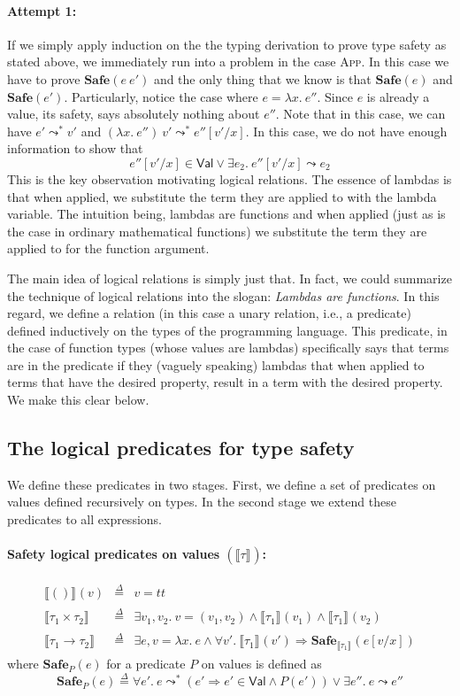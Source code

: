 \documentclass{article}
\newcommand{\TT}{\mathit{tt}}
\newcommand{\VAL}{\mathsf{Val}}
\newcommand{\UNT}{()}
\newcommand{\defeq}{\overset{\Delta}{=}}
\newcommand{\semtyp}[2]{\llbracket #2 \rrbracket_{#1}}
\begin{document}
\paragraph{Attempt 1:}
If we simply apply induction on the the typing derivation to prove
type safety as stated above, we immediately run into a problem
in the case \textsc{App}. In this case we have to prove $\mathbf{Safe}(e~e')$ and the only thing that we know is that $\mathbf{Safe}(e)$ and $\mathbf{Safe}(e')$.
Particularly, notice the case where $e = \lambda x.~e''$.
Since $e$ is already a value, its safety, says absolutely nothing about $e''$.
Note that in this case, we can have $e' \leadsto^* v'$ and
$(\lambda x.~e'')~v' \leadsto^* e''[v'/x]$.
In this case, we do not have enough information to show that
\[
e''[v'/x] \in \VAL \lor \exists e_2.~e''[v'/x] \leadsto e_2
\]
This is the key observation motivating logical relations.
The essence of lambdas is that when applied, we substitute the
term they are applied to with the lambda variable.
The intuition being, lambdas are functions and when applied
(just as is the case in ordinary mathematical functions) we substitute the term they are applied to for the function argument.

The main idea of logical relations is simply just that.
In fact, we could summarize the technique of logical relations into
the slogan: \emph{Lambdas are functions}.
In this regard, we define a relation (in this case a unary relation, i.e., a predicate) defined inductively on the types of the programming language. This predicate, in the case of function types (whose values are lambdas) specifically says that terms
are in the predicate if they (vaguely speaking) lambdas that
when applied to terms that have the desired property, result in
a term with the desired property. We make this clear below.

\subsection{The logical predicates for type safety}
We define these predicates in two stages. First, we define a
set of predicates on values defined recursively on types.
In the second stage we extend these predicates to all expressions.

\paragraph{Safety logical predicates on values $\left(\semtyp{}{\tau}\right)$:}
\[
\begin{array}{lll}
\semtyp{}{\UNT}(v) &\defeq& v = \TT\\
\semtyp{}{\tau_1 \times \tau_2} &\defeq& \exists v_1, v_2.~v = (v_1, v_2) \land
\semtyp{}{\tau_1}(v_1) \land \semtyp{}{\tau_1}(v_2)\\
\semtyp{}{\tau_1 \to \tau_2} &\defeq& \exists e, v = \lambda x.~e\land
\forall v'.~\semtyp{}{\tau_1}(v') \Rightarrow \mathbf{Safe}_{\semtyp{}{\tau_1}}(e[v/x])
\end{array}
\]
where $\mathbf{Safe}_{P}(e)$ for a predicate $P$ on values is defined as
\[
\mathbf{Safe}_{P}(e) \defeq \forall e'.~ e \leadsto^* (e'
\Rightarrow e' \in \VAL \land P(e')) \lor \exists e''.~e\leadsto e''
\]
\end{document}
